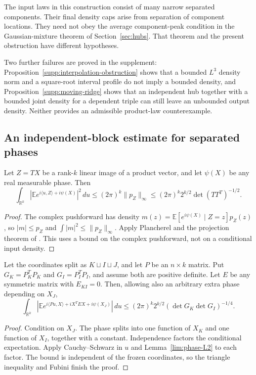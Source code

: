 The input laws in this construction consist of many narrow separated components. Their final density caps arise from separation of component locations. They need not obey the average component-peak condition in the Gaussian-mixture theorem of Section~\ref{sec:hubs}. That theorem and the present obstruction have different hypotheses.

Two further failures are proved in the supplement: Proposition~\ref{supp:interpolation-obstruction} shows that a bounded $L^3$ density norm and a square-root interval profile do not imply a bounded density, and Proposition~\ref{supp:moving-ridge} shows that an independent hub together with a bounded joint density for a dependent triple can still leave an unbounded output density. Neither provides an admissible product-law counterexample.

\subsection{An independent-block estimate for separated phases}

\begin{lemma}\label{lim:phase-L2}
Let $Z=T X$ be a rank-$k$ linear image of a product vector, and let $\psi(X)$ be any real measurable phase. Then
\[
 \int_{\mathbb R^k}|\mathbb E e^{i\langle u,Z\rangle+i\psi(X)}|^2\,du
 \le(2\pi)^k\|p_Z\|_\infty
 \le(2\pi)^k2^{k/2}\det(TT^T)^{-1/2}.
\]
\end{lemma}
\begin{proof}
The complex pushforward has density $m(z)=\mathbb E[e^{i\psi(X)}\mid Z=z]p_Z(z)$, so $|m|\le p_Z$ and $\int|m|^2\le\|p_Z\|_\infty$. Apply Plancherel and the projection theorem of \citet{LPP2016}. This uses a bound on the complex pushforward, not on a conditional input density.
\end{proof}

\begin{theorem}\label{lim:block-phase}
Let the coordinates split as $K\sqcup I\sqcup J$, and let $P$ be an $n\times k$ matrix. Put $G_K=P_K^TP_K$ and $G_I=P_I^TP_I$, and assume both are positive definite. Let $E$ be any symmetric matrix with $E_{KI}=0$. Then, allowing also an arbitrary extra phase depending on $X_J$,
\[
 \int_{\mathbb R^k}|\mathbb E e^{i\langle Pu,X\rangle+iX^TEX+i\psi(X_J)}|\,du
 \le(2\pi)^k2^{k/2}(\det G_K\det G_I)^{-1/4}.
\]
\end{theorem}
\begin{proof}
Condition on $X_J$. The phase splits into one function of $X_K$ and one function of $X_I$, together with a constant. Independence factors the conditional expectation. Apply Cauchy--Schwarz in $u$ and Lemma~\ref{lim:phase-L2} to each factor. The bound is independent of the frozen coordinates, so the triangle inequality and Fubini finish the proof.
\end{proof}

